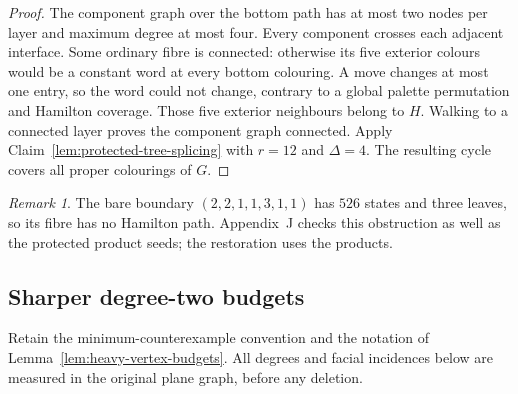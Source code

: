 \documentclass[11pt]{article}
\theoremstyle{remark}
\newtheorem{remark}[theorem]{Remark}
\numberwithin{equation}{section}
\numberwithin{table}{section}
\begin{document}
\begin{proof}
The component graph over the bottom path has at most two nodes per
layer and maximum degree at most four. Every component crosses each
adjacent interface. Some ordinary fibre is connected: otherwise its
five exterior colours would be a constant word at every bottom
colouring. A move changes at most one entry, so the word could not
change, contrary to a global palette permutation and Hamilton coverage.
Those five exterior neighbours belong to $H$. Walking to a connected
layer proves the component graph connected. Apply
Claim~\ref{lem:protected-tree-splicing} with $r=12$ and $\Delta=4$.
The resulting cycle covers all proper colourings of $G$.
\end{proof}

\begin{remark}
The bare boundary $(2,2,1,1,3,1,1)$ has $526$ states and three leaves,
so its fibre has no Hamilton path. Appendix~J checks this obstruction
as well as the protected product seeds; the restoration uses the products.
\end{remark}

\subsection{Sharper degree-two budgets}
Retain the minimum-counterexample convention and the notation of
Lemma~\ref{lem:heavy-vertex-budgets}. All degrees and facial incidences
below are measured in the original plane graph, before any deletion.
\end{document}
